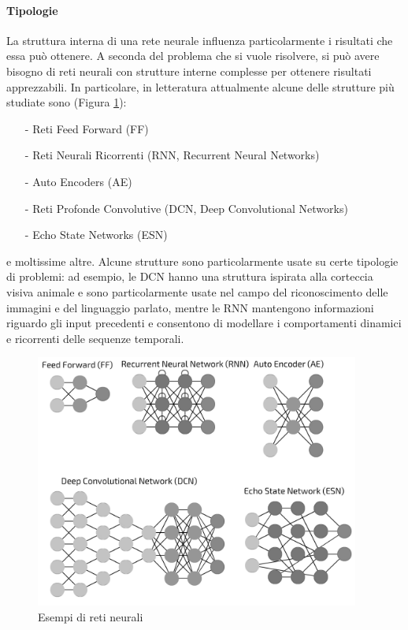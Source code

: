 \paragraph{Tipologie} La struttura interna di una rete neurale influenza particolarmente i risultati che essa può ottenere. A seconda del problema che si vuole risolvere, si può avere bisogno di reti neurali con strutture interne complesse per ottenere risultati apprezzabili. In particolare, in letteratura attualmente alcune delle strutture più studiate sono (Figura \ref{fig:tipologiereti}):
\begin{itemize}
    \item[-] Reti Feed Forward (FF)
    \item[-] Reti Neurali Ricorrenti (RNN, Recurrent Neural Networks)
    \item[-] Auto Encoders (AE)
    \item[-] Reti Profonde Convolutive (DCN, Deep Convolutional Networks)
    \item[-] Echo State Networks (ESN)
\end{itemize}
e moltissime altre. Alcune strutture sono particolarmente usate su certe tipologie di problemi: ad esempio, le DCN hanno una struttura ispirata alla corteccia visiva animale e sono particolarmente usate nel campo del riconoscimento delle immagini e del linguaggio parlato, mentre le RNN mantengono informazioni riguardo gli input precedenti e consentono di modellare i comportamenti dinamici e ricorrenti delle sequenze temporali.
\begin{figure}[b]
	\begin{center}
		\includegraphics[width=0.95\textwidth]{img/tipologiereti.png}
		\caption{Esempi di reti neurali}
		\label{fig:tipologiereti}
	\end{center}
\end{figure}

